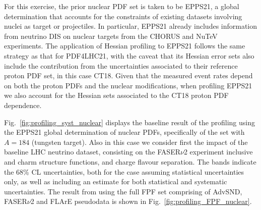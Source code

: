 For this exercise, the prior nuclear PDF set is taken to be EPPS21, a global determination
that accounts for the constraints of existing datasets involving nuclei as target or projectiles.
%
In particular, EPPS21 already includes information from neutrino DIS on nuclear targets
from the CHORUS and NuTeV experiments.
%
The application of Hessian profiling to EPPS21 follows the same strategy as that
for PDF4LHC21, with the caveat that its Hessian error sets also include the contribution
from the uncertainties  associated to their reference proton PDF set, in this case CT18.
%
Given that the measured event rates depend on both the proton PDFs and the nuclear modifications,
when profiling EPPS21 we also account for the Hessian sets associated to the CT18 proton
PDF dependence.

Fig.~\ref{fig:profiling_syst_nuclear} displays the baseline result of the profiling using the EPPS21 global determination of nuclear PDFs,
specifically of the set with $A=184$ (tungsten target).
%
Also in this case we consider first the impact of the baseline LHC neutrino dataset, consisting
on the FASER$\nu$2 experiment inclusive and charm structure functions,  and charge flavour
separation. 
The bands indicate the 68\% CL uncertainties, 
both for the case assuming statistical uncertainties only, 
as well as including an estimate for both statistical and systematic uncertainties.
The result from using the full FPF set comprising of AdvSND, FASER$\nu$2 and FLArE pseudodata is shown in Fig.~\ref{fig:profiling_FPF_nuclear}.

